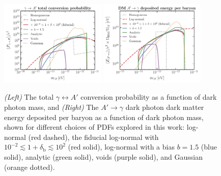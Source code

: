 \documentclass[prd,aps,10pt,nofootinbib,twocolumn,superscriptaddress,preprintnumbers,balancelastpage,longbibliography]{revtex4-1}
\begin{document}
%
\begin{figure}[htbp]
    \centering
    \includegraphics[width=0.45\textwidth]{plots/P_tot_m_Ap}
    \includegraphics[width=0.45\textwidth]{plots/energy_per_baryon}
    \caption{\emph{(Left)} The total $\gamma\leftrightarrow A'$ conversion probability as a function of dark photon mass, and \emph{(Right)} The $A' \to \gamma$ dark photon dark matter energy deposited per baryon as a function of dark photon mass, shown for different choices of PDFs explored in this work: log-normal (red dashed), the fiducial log-normal with $10^{-2} \lesssim 1 + \delta_\text{b} \lesssim 10^2$ (red solid), log-normal with a bias $b=1.5$ (blue solid), analytic (green solid), voids (purple solid), and Gaussian  (orange dotted).~~} 
    \label{fig:P_tot_m_Ap}
\end{figure}
%
\end{document}
